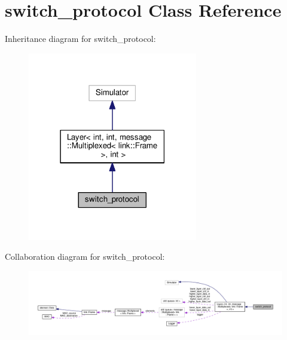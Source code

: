 \hypertarget{classswitch__protocol}{}\section{switch\+\_\+protocol Class Reference}
\label{classswitch__protocol}


Inheritance diagram for switch\+\_\+protocol\+:\nopagebreak
\begin{figure}[H]
\begin{center}
\leavevmode
\includegraphics[width=210pt]{classswitch__protocol__inherit__graph}
\end{center}
\end{figure}


Collaboration diagram for switch\+\_\+protocol\+:\nopagebreak
\begin{figure}[H]
\begin{center}
\leavevmode
\includegraphics[width=350pt]{classswitch__protocol__coll__graph}
\end{center}
\end{figure}
